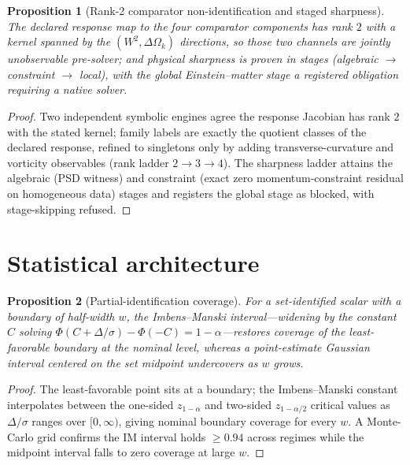 \documentclass[11pt]{article}
\newtheorem{proposition}{Proposition}
\begin{document}
\begin{proposition}[Rank-2 comparator non-identification and staged sharpness]
\label{prop:rank2}
The declared response map to the four comparator components has rank $2$ with a
kernel spanned by the $(W^2,\Delta\Omega_k)$ directions, so those two channels
are jointly unobservable pre-solver; and physical sharpness is proven in stages
(algebraic $\to$ constraint $\to$ local), with the global Einstein--matter stage
a registered obligation requiring a native solver.
\end{proposition}
\begin{proof}
Two independent symbolic engines agree the response Jacobian has rank $2$ with
the stated kernel; family labels are exactly the quotient classes of the declared
response, refined to singletons only by adding transverse-curvature and vorticity
observables (rank ladder $2\to3\to4$). The sharpness ladder attains the
algebraic (PSD witness) and constraint (exact zero momentum-constraint residual
on homogeneous data) stages and registers the global stage as blocked, with
stage-skipping refused.
\end{proof}

\section{Statistical architecture}
\label{sec:stats}
\begin{proposition}[Partial-identification coverage]
\label{prop:partialid}
For a set-identified scalar with a boundary of half-width $w$, the Imbens--Manski
interval---widening by the constant $C$ solving $\Phi(C+\Delta/\sigma)-\Phi(-C)=
1-\alpha$---restores coverage of the least-favorable boundary at the nominal
level, whereas a point-estimate Gaussian interval centered on the set midpoint
undercovers as $w$ grows.
\end{proposition}
\begin{proof}
The least-favorable point sits at a boundary; the Imbens--Manski constant
interpolates between the one-sided $z_{1-\alpha}$ and two-sided $z_{1-\alpha/2}$
critical values as $\Delta/\sigma$ ranges over $[0,\infty)$, giving nominal
boundary coverage for every $w$. A Monte-Carlo grid confirms the IM interval
holds $\ge0.94$ across regimes while the midpoint interval falls to zero coverage
at large $w$.
\end{proof}
\end{document}
